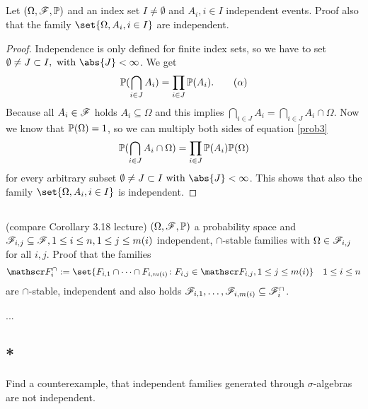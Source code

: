 \subsection{}
Let $(\Omega, \mathscr{F}, \mathbb{P})$ and an index set $I \neq \emptyset$ and $A_i, i \in I$ independent events. Proof also that the family $\set{\Omega, A_i , i \in I}$ are independent.
\begin{proof}
	Independence is only defined for finite index sets, so we have to set $\emptyset \neq J \subset I, \with \abs{J} < \infty$. 
	We get
	\begin{align*}
		\mathbb{P}(\bigcap_{i \in J}A_i) = \prod_{i \in J}\mathbb{P}(A_i). \label{prob3}\tag{$\alpha$}
	\end{align*}
	Because all $A_i \in \mathscr{F}$ holds $A_i \subseteq \Omega$ and this implies $\bigcap_{i \in J} A_i = \bigcap_{i \in J} A_i \cap \Omega$. Now we know that $\mathbb{P}(\Omega) = 1$, so we can multiply both sides of equation \ref{prob3}
	\begin{align*}
		\mathbb{P}(\bigcap_{i \in J}A_i \cap \Omega) = \prod_{i \in J}\mathbb{P}(A_i)\mathbb{P}(\Omega)
	\end{align*}
	for every arbitrary subset $\emptyset \neq J \subset I \with \abs{J} < \infty$. 
	This shows that also the family $\set{\Omega, A_i , i \in I}$ is independent.
\end{proof}
\subsection{}(compare Corollary 3.18 lecture)
$(\Omega, \mathscr{F}, \mathbb{P})$ a probability space and $\mathscr{F}_{i,j} \subseteq \mathscr{F}, 1 \le i \le n, 1 \le j \le m(i)$ independent, $\cap$-stable families with $\Omega \in \mathscr{F}_{i,j}$ for all $i,j$. Proof that the families
\begin{align*}
	\F_i^{\cap} := \set{F_{i,1} \cap \cdots \cap F_{i, m(i)} \colon F_{i,j} \in \F_{i,j}, 1 \le j \le m(i)} \quad 1 \le i \le n
\end{align*}
are $\cap$-stable, independent and also holds $\mathscr{F}_{i,1},\dots, \mathscr{F}_{i,m(i)} \subseteq \mathscr{F}_i^{\cap}$.

\begin{solution}
	...
\end{solution}
\subsection{*}
Find a counterexample, that independent families generated through $\sigma$-algebras are not independent.